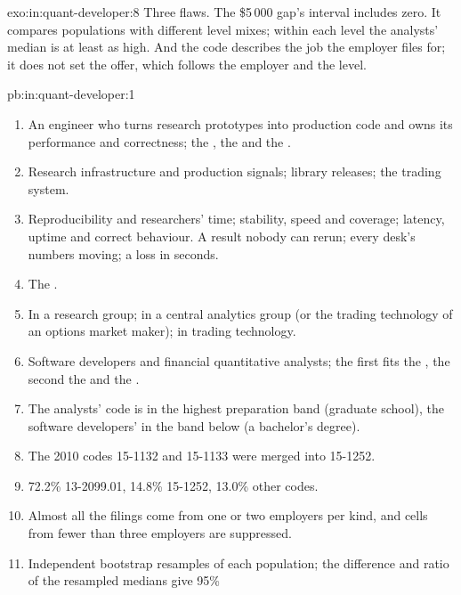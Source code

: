 \begin{solution}{exo:in:quant-developer:8}
Three flaws. The \$5\,000 gap's interval includes zero. It compares populations with different level mixes; within each
level the analysts' median is at least as high. And the code describes the job the employer files for; it does not set
the offer, which follows the employer and the level.
\end{solution}

\begin{solution}{pb:in:quant-developer:1}
\begin{enumerate}
\item An engineer who turns research prototypes into production code and owns its performance and correctness; the
, the  and the .
\item Research infrastructure and production signals; library releases; the trading system.
\item Reproducibility and researchers' time; stability, speed and coverage; latency, uptime and correct behaviour. A result
nobody can rerun; every desk's numbers moving; a loss in seconds.
\item The .
\item In a research group; in a central analytics group (or the trading technology of an options market maker); in
trading technology.
\item Software developers and financial quantitative analysts; the first fits the , the second the
 and the .
\item The analysts' code is in the highest preparation band (graduate school), the software developers' in the band below
(a bachelor's degree).
\item The 2010 codes 15-1132 and 15-1133 were merged into 15-1252.
\item 72.2\% 13-2099.01, 14.8\% 15-1252, 13.0\% other codes.
\item Almost all the filings come from one or two employers per kind, and cells from fewer than three employers are
suppressed.
\item Independent bootstrap resamples of each population; the difference and ratio of the resampled medians give 95\%

\end{enumerate}
\end{solution}
